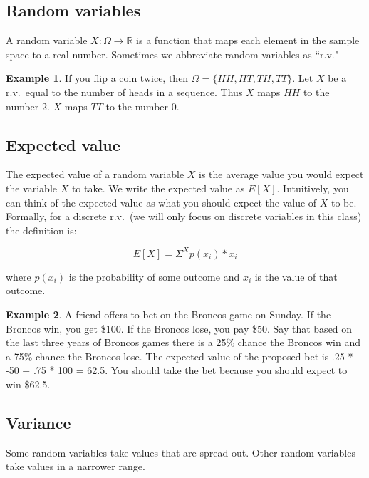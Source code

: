 \documentclass[]{article}
\theoremstyle{definition}
\newtheorem{exmp}{Example}[section]
\begin{document}
\subsection{Random variables}

A random variable $X: \Omega \rightarrow \mathbb{R}$ is a function that maps each element in the sample space to a real number. Sometimes we abbreviate random variables as ``r.v."

\begin{exmp}
If you flip a coin twice, then $\Omega = \{HH, HT, TH, TT\}$. Let $X$ be a r.v.\ equal to the number of heads in a sequence. Thus $X$ maps $HH$ to the number 2. $X$ maps $TT$ to the number 0.
\end{exmp} 

\subsection{Expected value}

The expected value of a random variable $X$ is the average value you would expect the variable $X$ to take. We write the expected value as $E[X]$. Intuitively, you can think of the expected value as what you should expect the value of $X$ to be. Formally, for a discrete r.v.\ (we will only focus on discrete variables in this class) the definition is: 

\begin{equation}
E[X] = \Sigma^X p(x_i) * x_i
\end{equation}

\noindent where $p(x_i)$ is the probability of some outcome and $x_i$ is the value of that outcome.

\begin{exmp}
A friend offers to bet on the Broncos game on Sunday. If the Broncos win, you get \$100. If the Broncos lose, you pay \$50. Say that based on the last three years of Broncos games there is a 25\% chance the Broncos win and a 75\% chance the Broncos lose. The expected value of the proposed bet is .25 * -50 + .75 * 100 = 62.5. You should take the bet because you should expect to win \$62.5.
\end{exmp} 

\subsection{Variance}
Some random variables take values that are spread out. Other random variables take values in a narrower range.
\end{document}
